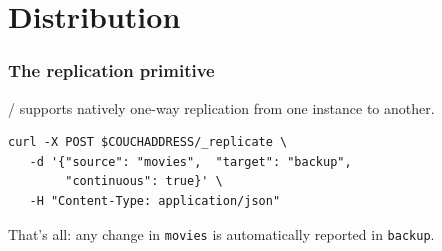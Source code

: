 \section{Distribution}

\begin{frame}[fragile]
\frametitle{The replication primitive}

\couchdb/ supports natively one-way \alert{replication} from one instance to
another.


\begin{verbatim}
curl -X POST $COUCHADDRESS/_replicate \
   -d '{"source": "movies",  "target": "backup", 
        "continuous": true}' \
   -H "Content-Type: application/json"
\end{verbatim}

\vfill

That's all: any change in \texttt{movies} is automatically reported in
\texttt{backup}.

\end{frame}

